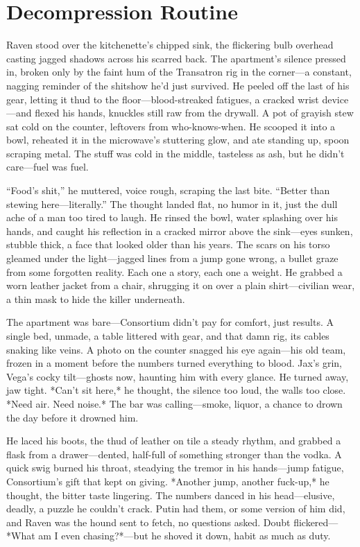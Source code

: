 \documentclass[12pt]{book}
\begin{document}
\section{Decompression Routine}

Raven stood over the kitchenette’s chipped sink, the flickering bulb overhead casting jagged shadows across his scarred back. The apartment’s silence pressed in, broken only by the faint hum of the Transatron rig in the corner—a constant, nagging reminder of the shitshow he’d just survived. He peeled off the last of his gear, letting it thud to the floor—blood-streaked fatigues, a cracked wrist device—and flexed his hands, knuckles still raw from the drywall. A pot of grayish stew sat cold on the counter, leftovers from who-knows-when. He scooped it into a bowl, reheated it in the microwave’s stuttering glow, and ate standing up, spoon scraping metal. The stuff was cold in the middle, tasteless as ash, but he didn’t care—fuel was fuel.

“Food’s shit,” he muttered, voice rough, scraping the last bite. “Better than stewing here—literally.” The thought landed flat, no humor in it, just the dull ache of a man too tired to laugh. He rinsed the bowl, water splashing over his hands, and caught his reflection in a cracked mirror above the sink—eyes sunken, stubble thick, a face that looked older than his years. The scars on his torso gleamed under the light—jagged lines from a jump gone wrong, a bullet graze from some forgotten reality. Each one a story, each one a weight. He grabbed a worn leather jacket from a chair, shrugging it on over a plain shirt—civilian wear, a thin mask to hide the killer underneath.

The apartment was bare—Consortium didn’t pay for comfort, just results. A single bed, unmade, a table littered with gear, and that damn rig, its cables snaking like veins. A photo on the counter snagged his eye again—his old team, frozen in a moment before the numbers turned everything to blood. Jax’s grin, Vega’s cocky tilt—ghosts now, haunting him with every glance. He turned away, jaw tight. *Can’t sit here,* he thought, the silence too loud, the walls too close. *Need air. Need noise.* The bar was calling—smoke, liquor, a chance to drown the day before it drowned him.

He laced his boots, the thud of leather on tile a steady rhythm, and grabbed a flask from a drawer—dented, half-full of something stronger than the vodka. A quick swig burned his throat, steadying the tremor in his hands—jump fatigue, Consortium’s gift that kept on giving. *Another jump, another fuck-up,* he thought, the bitter taste lingering. The numbers danced in his head—elusive, deadly, a puzzle he couldn’t crack. Putin had them, or some version of him did, and Raven was the hound sent to fetch, no questions asked. Doubt flickered—*What am I even chasing?*—but he shoved it down, habit as much as duty.
\end{document}
